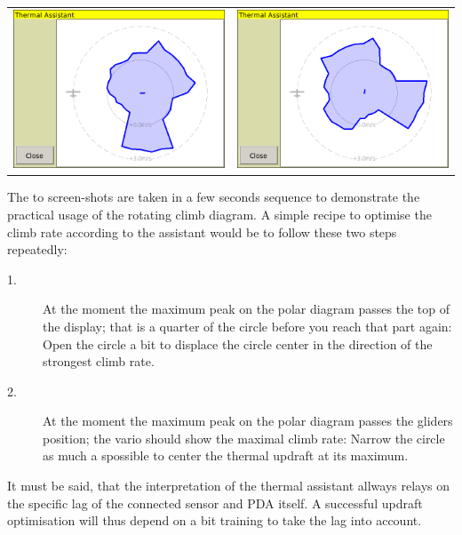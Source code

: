 \documentclass[a4paper,12pt]{refrep}
\begin{document}
\begin{tabular}{c c}
\includegraphics[angle=0,width=0.5\linewidth,keepaspectratio='true']{figures/dialog-thermal-assistant0.png}&
\includegraphics[angle=0,width=0.5\linewidth,keepaspectratio='true']{figures/dialog-thermal-assistant1.png}\\
\end{tabular}

The to screen-shots are taken in a few seconds sequence to demonstrate the
practical usage of the rotating climb diagram. A simple recipe to optimise
the climb rate according to the assistant would be to follow these two steps
repeatedly:
\begin{description}
\item[1.]  At the moment the maximum peak on the polar diagram passes the top of
the display; that is a quarter of the circle before you reach that part again:
Open the circle a bit to displace the circle center in the direction of the
strongest climb rate.
\item[2.]  At the moment the maximum peak on the polar diagram passes the
gliders position; the vario should show the maximal climb rate: Narrow the
circle as much a spossible to center the thermal updraft at its maximum. 
\end{description}

It must be said, that the interpretation of the thermal assistant allways relays
on the specific lag of the connected sensor and PDA itself. A successful
updraft optimisation will thus depend on a bit training to take the lag into account.
\end{document}
